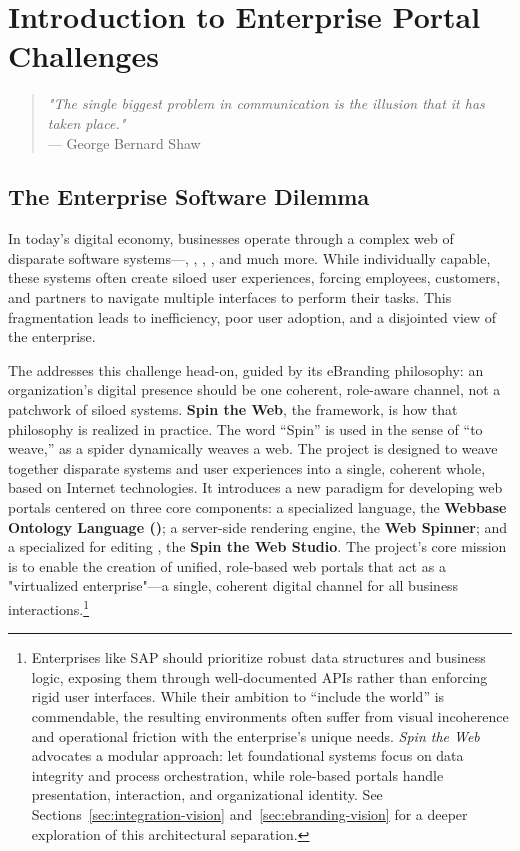 
\chapter{Introduction to Enterprise Portal Challenges}
\label{chap:intro}

\begin{quote}
\textit{"The single biggest problem in communication is the illusion that it has taken place."} \\
— George Bernard Shaw
\end{quote}

\section{The Enterprise Software Dilemma}
\label{sec:enterprise-dilemma}

In today's digital economy, businesses operate through a complex web of disparate software systems—, , , , and much more. While individually capable, these systems often create siloed user experiences, forcing employees, customers, and partners to navigate multiple interfaces to perform their tasks. This fragmentation leads to inefficiency, poor user adoption, and a disjointed view of the enterprise.

The \organization{} addresses this challenge head-on, guided by its eBranding philosophy: an organization's digital presence should be one coherent, role-aware channel, not a patchwork of siloed systems. \textbf{Spin the Web}, the framework, is how that philosophy is realized in practice. The word ``Spin'' is used in the sense of ``to weave,'' as a spider dynamically weaves a web. The project is designed to weave together disparate systems and user experiences into a single, coherent whole, based on Internet technologies. It introduces a new paradigm for developing web portals centered on three core components: a specialized language, the \textbf{Webbase Ontology Language (\wbol{})}; a server-side rendering engine, the \textbf{Web Spinner}; and a specialized \webbaselet{} for editing , the \textbf{Spin the Web Studio}. The project's core mission is to enable the creation of unified, role-based web portals that act as a "virtualized enterprise"—a single, coherent digital channel for all business interactions.\footnote{Enterprises like SAP should prioritize robust data structures and business logic, exposing them through well-documented APIs rather than enforcing rigid user interfaces. While their ambition to “include the world” is commendable, the resulting environments often suffer from visual incoherence and operational friction with the enterprise's unique needs. \textit{Spin the Web} advocates a modular approach: let foundational systems focus on data integrity and process orchestration, while role-based portals handle presentation, interaction, and organizational identity. See Sections~\ref{sec:integration-vision} and~\ref{sec:ebranding-vision} for a deeper exploration of this architectural separation.}

